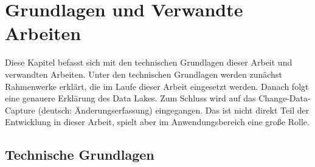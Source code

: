 \chapter{Grundlagen und Verwandte Arbeiten}

Diese Kapitel befasst sich mit den technischen Grundlagen dieser Arbeit und verwandten Arbeiten.
Unter den technischen Grundlagen werden zunächst Rahmenwerke erklärt, die im Laufe dieser Arbeit eingesetzt werden.
Danach folgt eine genauere Erklärung des Data Lakes.
Zum Schluss wird auf das Change-Data-Capture (deutsch: Änderungserfassung) eingegangen.
Das ist nicht direkt Teil der Entwicklung in dieser Arbeit, spielt aber im Anwendungsbereich eine große Rolle.

\section{Technische Grundlagen}






